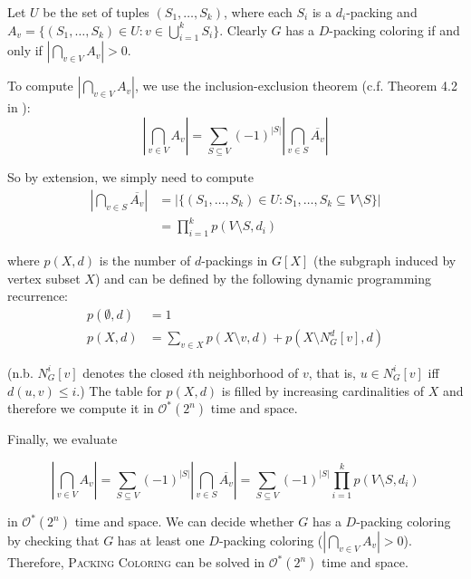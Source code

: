 \documentclass[12pt, a4paper]{article}
\theoremstyle{definition}
\newcommand{\mcO}{\mathcal{O}}
\begin{document}
Let $U$ be the set of tuples $(S_1, \dotsc, S_k)$, where each $S_i$ is a $d_i$-packing and $A_v = \{ (S_1, \dotsc, S_k) \in U : v \in \bigcup_{i=1}^{k} S_i\}$. Clearly $G$ has a $D$-packing coloring if and only if $\left | \bigcap_{v \in V} A_v \right | > 0$.

To compute $\left | \bigcap_{v \in V} A_v \right |$, we use the inclusion-exclusion theorem (c.f. Theorem 4.2 in \cite{Fomin2010}):
\begin{equation} \label{eq:incl_excl}
	\left | \bigcap_{v \in V} A_v \right | = \sum_{S \subseteq V} (-1)^{|S|} \left | \bigcap_{v \in S} \overline{A_v} \right | 
\end{equation}

So by extension, we simply need to compute 
\begin{align*}
	\left | \bigcap_{v \in S} \overline{A_v} \right | &= \left | \{ (S_1, \dotsc, S_k) \in U : S_1, \dotsc, S_k \subseteq V \setminus S \} \right | \\
													  &= \prod_{i=1}^{k} p(V \setminus S, d_i)
\end{align*}

where $p(X, d)$ is the number of $d$-packings in $G[X]$ (the subgraph induced by vertex subset $X$) and can be defined by the following dynamic programming recurrence:
\begin{align*}
	p(\emptyset, d) &= 1 \\
	p(X, d) &= \sum_{v \in X} p(X \setminus {v}, d) + p(X \setminus N_G^d[v], d)   
\end{align*}

(n.b. $N_G^i[v]$ denotes the closed $i$th neighborhood of $v$, that is, $u \in N_G^i[v]$ iff $d(u, v) \leq i$.) The table for $p(X, d)$ is filled by increasing cardinalities of $X$ and therefore we compute it in $\mcO^*(2^n)$ time and space. 

Finally, we evaluate

\begin{equation} \label{eq:incl_excl_final}
	\left | \bigcap_{v \in V} A_v \right | 
	= \sum_{S \subseteq V} (-1)^{|S|} \left | \bigcap_{v \in S} \overline{A_v} \right | 
	= \sum_{S \subseteq V} (-1)^{|S|} \prod_{i=1}^{k} p(V \setminus S, d_i)
\end{equation}

in $\mcO^*(2^n)$ time and space. We can decide whether $G$ has a $D$-packing coloring by checking that $G$ has at least one $D$-packing coloring ($\left | \bigcap_{v \in V} A_v \right | > 0$). Therefore, \textsc{Packing Coloring} can be solved in $\mcO^*(2^n)$ time and space.
\end{document}
